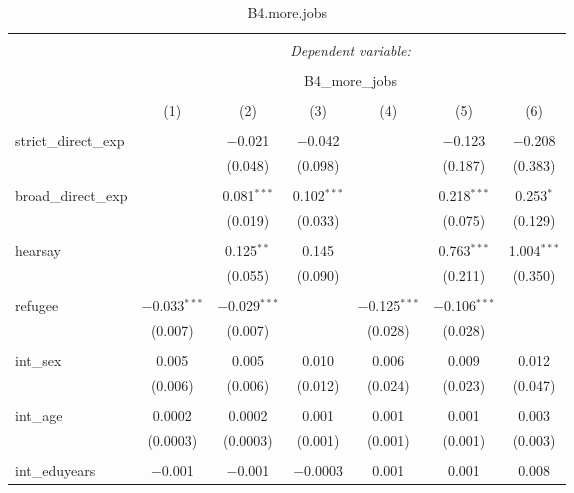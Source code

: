 
\begin{table}[H] \centering 
  \caption{B4.more.jobs} 
  \label{} 
\tiny 
\begin{tabular}{@{\extracolsep{4pt}}lcccccc} 
\\[-1.8ex]\hline 
\hline \\[-1.8ex] 
 & \multicolumn{6}{c}{\textit{Dependent variable:}} \\ 
\cline{2-7} 
\\[-1.8ex] & \multicolumn{6}{c}{B4\_more\_jobs} \\ 
\\[-1.8ex] & (1) & (2) & (3) & (4) & (5) & (6)\\ 
\hline \\[-1.8ex] 
 strict\_direct\_exp &  & $-$0.021 & $-$0.042 &  & $-$0.123 & $-$0.208 \\ 
  &  & (0.048) & (0.098) &  & (0.187) & (0.383) \\ 
  & & & & & & \\ 
 broad\_direct\_exp &  & 0.081$^{***}$ & 0.102$^{***}$ &  & 0.218$^{***}$ & 0.253$^{*}$ \\ 
  &  & (0.019) & (0.033) &  & (0.075) & (0.129) \\ 
  & & & & & & \\ 
 hearsay &  & 0.125$^{**}$ & 0.145 &  & 0.763$^{***}$ & 1.004$^{***}$ \\ 
  &  & (0.055) & (0.090) &  & (0.211) & (0.350) \\ 
  & & & & & & \\ 
 refugee & $-$0.033$^{***}$ & $-$0.029$^{***}$ &  & $-$0.125$^{***}$ & $-$0.106$^{***}$ &  \\ 
  & (0.007) & (0.007) &  & (0.028) & (0.028) &  \\ 
  & & & & & & \\ 
 int\_sex & 0.005 & 0.005 & 0.010 & 0.006 & 0.009 & 0.012 \\ 
  & (0.006) & (0.006) & (0.012) & (0.024) & (0.023) & (0.047) \\ 
  & & & & & & \\ 
 int\_age & 0.0002 & 0.0002 & 0.001 & 0.001 & 0.001 & 0.003 \\ 
  & (0.0003) & (0.0003) & (0.001) & (0.001) & (0.001) & (0.003) \\ 
  & & & & & & \\ 
 int\_eduyears & $-$0.001 & $-$0.001 & $-$0.0003 & 0.001 & 0.001 & 0.008 \\ 

\end{tabular}
\end{table}
